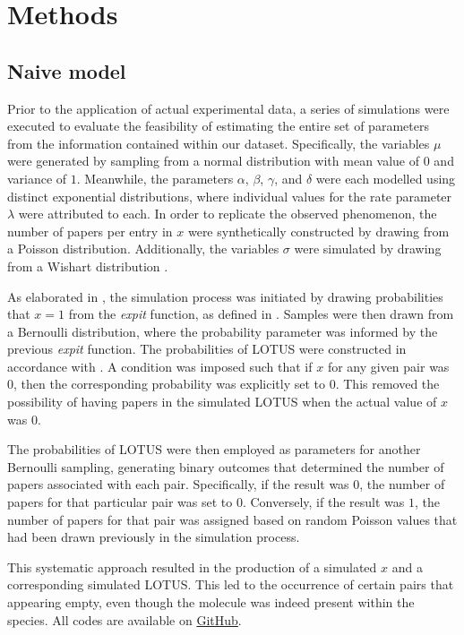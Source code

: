 \documentclass[
11pt, %
oneside, %
english, %
singlespacing, %
headsepline, %
chapterinoneline, %
]{MastersDoctoralThesis} %
\begin{document}
\chapter{Methods}\label{chap:Methods}
\section{Naive model}
Prior to the application of actual experimental data, a series of simulations were executed to evaluate the feasibility of estimating the entire set of parameters from the information contained within our dataset. Specifically, the variables $\mu$ were generated by sampling from a normal distribution with mean value of $0$ and variance of $1$. Meanwhile, the parameters $\alpha$, $\beta$, $\gamma$, and $\delta$ were each modelled using distinct exponential distributions, where individual values for the rate parameter $\lambda$ were attributed to each. In order to replicate the observed phenomenon, the number of papers per entry in $x$ were synthetically constructed by drawing from a Poisson distribution. Additionally, the variables $\sigma$ were simulated by drawing from a Wishart distribution \cite{wishartGENERALISEDPRODUCTMOMENT1928}.

As elaborated in , the simulation process was initiated by drawing probabilities that $x=1$ from the \textit{expit} function, as defined in . 
Samples were then drawn from a Bernoulli distribution, where the probability parameter was informed by the previous \textit{expit} function. The probabilities of LOTUS were constructed in accordance with . A condition was imposed such that if $x$ for any given pair was $0$, then the corresponding probability was explicitly set to $0$. This removed the possibility of having papers in the simulated LOTUS when the actual value of $x$ was $0$.

The probabilities of LOTUS were then employed as parameters for another Bernoulli sampling, generating binary outcomes that determined the number of papers associated with each pair. Specifically, if the result was $0$, the number of papers for that particular pair was set to $0$. Conversely, if the result was $1$, the number of papers for that pair was assigned based on random Poisson values that had been drawn previously in the simulation process.

This systematic approach resulted in the production of a simulated $x$ and a corresponding simulated LOTUS. This led to the occurrence of certain pairs that appearing empty, even though the molecule was indeed present within the species. All codes are available on \href{https://github.com/commons-research/anticipated-lotus}{GitHub}.
 
\end{document}
